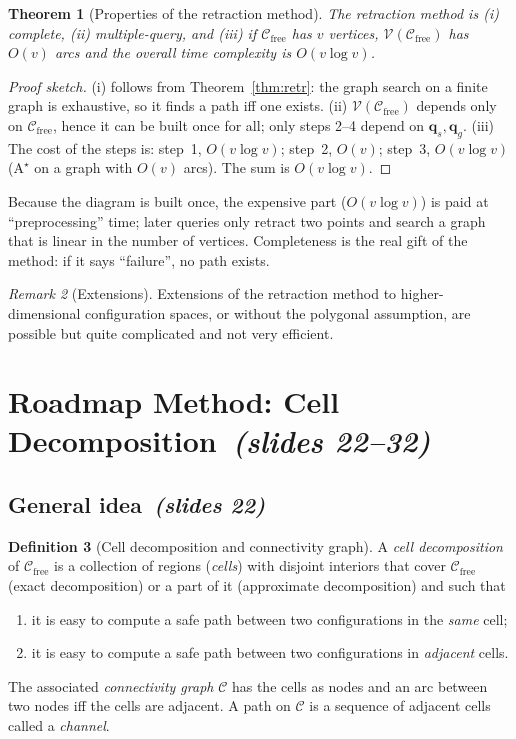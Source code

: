 \documentclass[11pt,a4paper]{article}
\newcommand{\Cfree}{\mathcal{C}_{\mathrm{free}}}
\newcommand{\Vor}{\mathcal{V}}
\newcommand{\qs}{\boldsymbol{q}_s}
\newcommand{\qg}{\boldsymbol{q}_g}
\newcommand{\slides}[1]{\emph{(slides #1)}}
\newcommand{\sect}[2]{\section{#1\texorpdfstring{\ \slides{#2}}{ (slides #2)}}}
\newcommand{\subsect}[2]{\subsection{#1\texorpdfstring{\ \slides{#2}}{ (slides #2)}}}
\theoremstyle{definition}
\newtheorem{definition}{Definition}[section]
\theoremstyle{plain}
\newtheorem{theorem}[definition]{Theorem}
\theoremstyle{remark}
\newtheorem{remark}[definition]{Remark}
\begin{document}
\begin{theorem}[Properties of the retraction method]
\label{thm:retr-props}
The retraction method is (i) complete, (ii) multiple-query, and (iii) if $\Cfree$ has $v$ vertices, $\Vor(\Cfree)$ has $O(v)$ arcs and the overall time complexity is $O(v\log v)$.
\end{theorem}
\begin{proof}[Proof sketch]
(i) follows from Theorem~\ref{thm:retr}: the graph search on a finite graph is exhaustive, so it finds a path iff one exists. (ii) $\Vor(\Cfree)$ depends only on $\Cfree$, hence it can be built once for all; only steps 2--4 depend on $\qs,\qg$. (iii) The cost of the steps is: step~1, $O(v\log v)$; step~2, $O(v)$; step~3, $O(v\log v)$ ($\mathrm{A}^\star$ on a graph with $O(v)$ arcs). The sum is $O(v\log v)$.
\end{proof}

\begin{intuition}
Because the diagram is built once, the expensive part ($O(v\log v)$) is paid at ``preprocessing'' time; later queries only retract two points and search a graph that is linear in the number of vertices. Completeness is the real gift of the method: if it says ``failure'', no path exists.
\end{intuition}

\begin{remark}[Extensions]
Extensions of the retraction method to higher-dimensional configuration spaces, or without the polygonal assumption, are possible but quite complicated and not very efficient.
\end{remark}

\sect{Roadmap Method: Cell Decomposition}{22--32}
\label{sec:cells}

\subsect{General idea}{22}

\begin{definition}[Cell decomposition and connectivity graph]
A \emph{cell decomposition} of $\Cfree$ is a collection of regions (\emph{cells}) with disjoint interiors that cover $\Cfree$ (exact decomposition) or a part of it (approximate decomposition) and such that
\begin{enumerate}
  \item[(P1)] it is easy to compute a safe path between two configurations in the \emph{same} cell;
  \item[(P2)] it is easy to compute a safe path between two configurations in \emph{adjacent} cells.
\end{enumerate}
The associated \emph{connectivity graph} $\mathcal{C}$ has the cells as nodes and an arc between two nodes iff the cells are adjacent. A path on $\mathcal{C}$ is a sequence of adjacent cells called a \emph{channel}.
\end{definition}
\end{document}
